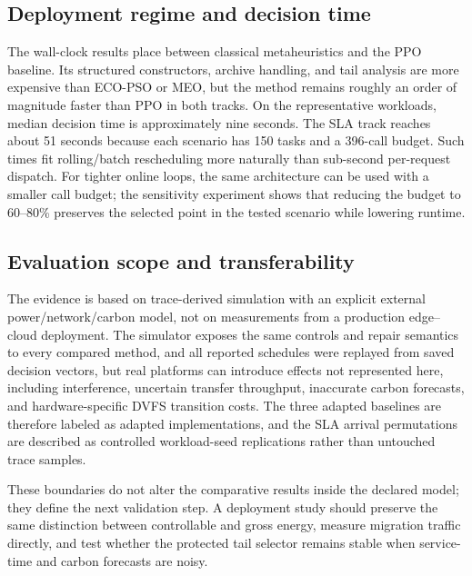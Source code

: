 \subsection{Deployment regime and decision time}

The wall-clock results place \method between classical metaheuristics and the PPO baseline. Its structured constructors, archive handling, and tail analysis are more expensive than ECO-PSO or MEO, but the method remains roughly an order of magnitude faster than PPO in both tracks. On the representative workloads, median decision time is approximately nine seconds. The SLA track reaches about 51 seconds because each scenario has 150 tasks and a 396-call budget. Such times fit rolling/batch rescheduling more naturally than sub-second per-request dispatch. For tighter online loops, the same architecture can be used with a smaller call budget; the sensitivity experiment shows that reducing the budget to 60--80\% preserves the selected point in the tested scenario while lowering runtime.

\subsection{Evaluation scope and transferability}

The evidence is based on trace-derived simulation with an explicit external power/network/carbon model, not on measurements from a production edge--cloud deployment. The simulator exposes the same controls and repair semantics to every compared method, and all reported schedules were replayed from saved decision vectors, but real platforms can introduce effects not represented here, including interference, uncertain transfer throughput, inaccurate carbon forecasts, and hardware-specific DVFS transition costs. The three adapted baselines are therefore labeled as adapted implementations, and the SLA arrival permutations are described as controlled workload-seed replications rather than untouched trace samples.

These boundaries do not alter the comparative results inside the declared model; they define the next validation step. A deployment study should preserve the same distinction between controllable and gross energy, measure migration traffic directly, and test whether the protected tail selector remains stable when service-time and carbon forecasts are noisy.

